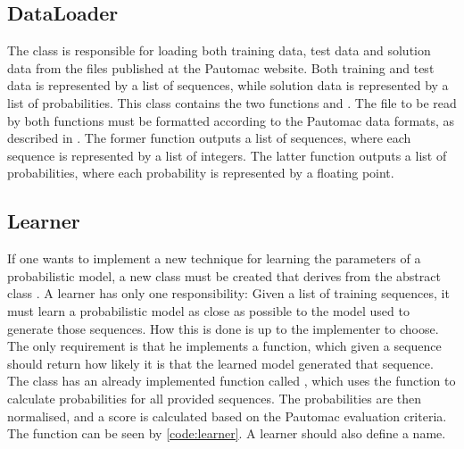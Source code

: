 \subsection{DataLoader}
The  class is responsible for loading both training data, test data and solution data from the files published at the Pautomac website. Both training and test data is represented by a list of sequences, while solution data is represented by a list of probabilities.
This class contains the two functions  and . The file to be read by both functions must be formatted according to the Pautomac data formats, as described in . The former function outputs a list of sequences, where each sequence is represented by a list of integers.
The latter function outputs a list of probabilities, where each probability is represented by a floating point.

\subsection{Learner}
If one wants to implement a new technique for learning the parameters of a probabilistic model, a new class must be created that derives from the abstract class .
A learner has only one responsibility: Given a list of training sequences, it must learn a probabilistic model as close as possible to the model used to generate those sequences. How this is done is up to the implementer to choose. The only requirement is that he implements a  function, which given a sequence should return how likely it is that the learned model generated that sequence.
The  class has an already implemented function called , which uses the  function to calculate probabilities for all provided sequences.
The probabilities are then normalised, and a score is calculated based on the Pautomac evaluation criteria.
The  function can be seen by \ref{code:learner}.
A learner should also define a name.

